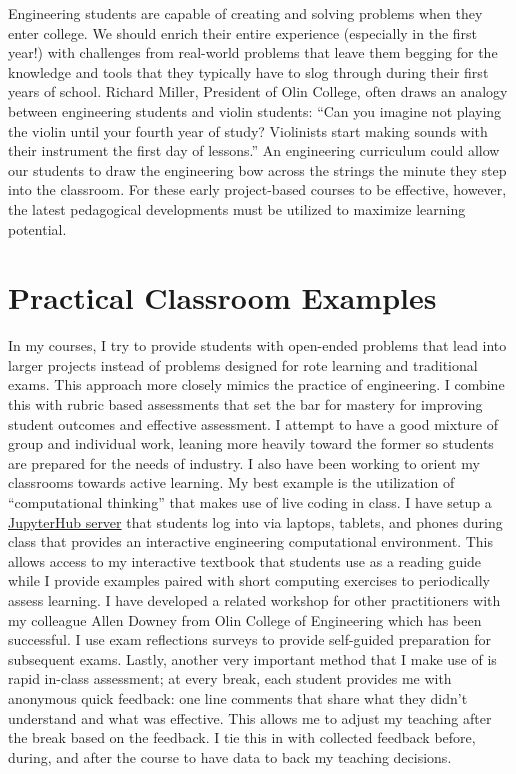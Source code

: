 \documentclass{article}
\begin{document}
Engineering students are capable of creating and solving problems when they
enter college. We should enrich their entire experience (especially in the first
year!) with challenges from real-world problems that leave them begging for the
knowledge and tools that they typically have to slog through during their first
years of school. Richard Miller, President of Olin College, often draws an
analogy between engineering students and violin students: ``Can you imagine not
playing the violin until your fourth year of study? Violinists start making
sounds with their instrument the first day of lessons.'' An engineering
curriculum could allow our students to draw the engineering bow across the
strings the minute they step into the classroom. For these early project-based
courses to be effective, however, the latest pedagogical developments must be
utilized to maximize learning potential.

\section*{Practical Classroom Examples}
%
In my courses, I try to provide students with open-ended problems that lead
into larger projects instead of problems designed for rote learning and
traditional exams. This approach more closely mimics the practice of
engineering. I combine this with rubric based assessments that set the bar for
mastery for improving student outcomes and effective assessment. I attempt to
have a good mixture of group and individual work, leaning more heavily toward
the former so students are prepared for the needs of industry. I also have been
working to orient my classrooms towards active learning. My best example is the
utilization of ``computational thinking'' that makes use of live coding in
class. I have setup a \href{https://jupyter.libretexts.org}{JupyterHub server}
that students log into via laptops, tablets, and phones during class that
provides an interactive engineering computational environment. This allows
access to my interactive textbook that students use as a reading guide while I
provide examples paired with short computing exercises to periodically assess
learning. I have developed a related workshop for other practitioners with my
colleague Allen Downey from Olin College of Engineering which has been
successful. I use exam reflections surveys to provide self-guided preparation
for subsequent exams. Lastly, another very important method that I make use of
is rapid in-class assessment; at every break, each student provides me with
anonymous quick feedback: one line comments that share what they didn't
understand and what was effective.  This allows me to adjust my teaching after
the break based on the feedback. I tie this in with collected feedback before,
during, and after the course to have data to back my teaching decisions.
\end{document}
